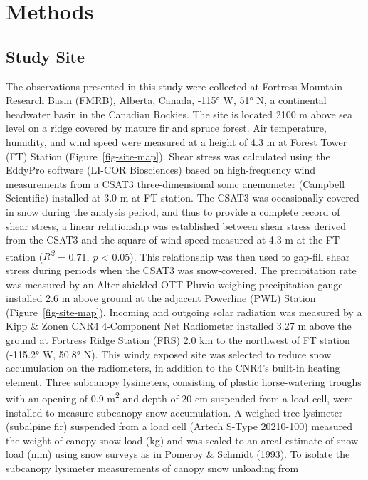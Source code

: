 \documentclass[
  letterpaper,
]{tex/uofsthesis-cs}
\begin{document}
\section{Methods}\label{methods}

\subsection{Study Site}\label{study-site-1}

The observations presented in this study were collected at Fortress
Mountain Research Basin (FMRB), Alberta, Canada, -115° W, 51° N, a
continental headwater basin in the Canadian Rockies. The site is located
2100 m above sea level on a ridge covered by mature fir and spruce
forest. Air temperature, humidity, and wind speed were measured at a
height of 4.3 m at Forest Tower (FT) Station
(Figure~\ref{fig-site-map}). Shear stress was calculated using the
EddyPro software (LI-COR Biosciences) based on high-frequency wind
measurements from a CSAT3 three-dimensional sonic anemometer (Campbell
Scientific) installed at 3.0 m at FT station. The CSAT3 was occasionally
covered in snow during the analysis period, and thus to provide a
complete record of shear stress, a linear relationship was established
between shear stress derived from the CSAT3 and the square of wind speed
measured at 4.3 m at the FT station (\emph{R\textsuperscript{2}} = 0.71,
\emph{p} \textless{} 0.05). This relationship was then used to gap-fill
shear stress during periods when the CSAT3 was snow-covered. The
precipitation rate was measured by an Alter-shielded OTT Pluvio weighing
precipitation gauge installed 2.6 m above ground at the adjacent
Powerline (PWL) Station (Figure~\ref{fig-site-map}). Incoming and
outgoing solar radiation was measured by a Kipp \& Zonen CNR4
4-Component Net Radiometer installed 3.27 m above the ground at Fortress
Ridge Station (FRS) 2.0 km to the northwest of FT station (-115.2° W,
50.8° N). This windy exposed site was selected to reduce snow
accumulation on the radiometers, in addition to the CNR4's built-in
heating element. Three subcanopy lysimeters, consisting of plastic
horse-watering troughs with an opening of 0.9 m\textsuperscript{2} and
depth of 20 cm suspended from a load cell, were installed to measure
subcanopy snow accumulation. A weighed tree lysimeter (subalpine fir)
suspended from a load cell (Artech S-Type 20210-100) measured the weight
of canopy snow load (kg) and was scaled to an areal estimate of snow
load (mm) using snow surveys as in Pomeroy \& Schmidt (1993). To isolate
the subcanopy lysimeter measurements of canopy snow unloading from
\end{document}

